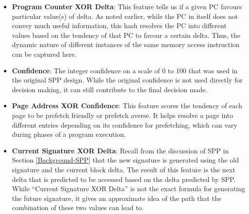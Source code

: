 \begin{itemize}
\item \textbf{Program Counter XOR Delta}: This feature tells us if a
  given PC favours particular value(s) of delta.  As noted earlier,
  while the PC in itself does not convey much useful information, this
  hash resolves the PC into different values based on the tendency of
  that PC to favour a certain delta.  Thus, the dynamic nature of
  different instances of the same memory access instruction can be
  captured here.

\item \textbf{Confidence}: The integer confidence on a scale of 0 to
  100 that was used in the original SPP design. While the original
  confidence is not used directly for decision making, it can still
  contribute to the final decision made.

\item \textbf{Page Address XOR Confidence}: This feature scores the
  tendency of each page to be prefetch friendly or prefetch averse. It
  helps resolve a page into different entries depending on its
  confidence for prefetching, which can vary during phases of a
  program execution.

\item \textbf{Current Signature XOR Delta}: Recall from the discussion
  of SPP in Section \ref{Background-SPP} that the new signature is
  generated using the old signature and the current block delta.
  The result of this feature is the next delta that is predicted to be
  accessed based on the delta predicted by SPP. While ``Current
  Signature XOR Delta'' is not the exact formula for generating the
  future signature, it gives an approximate idea of the path that the
  combination of these two values can lead to.



\end{itemize} 


